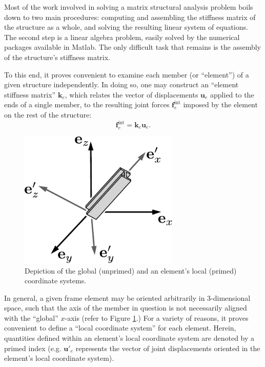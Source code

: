 \documentclass[12pt,a4paper,article]{memoir} %
\begin{document}
Most of the work involved in solving a matrix structural analysis problem boils down to two main procedures: computing and assembling the stiffness matrix of the structure as a whole, and solving the resulting linear system of equations. The second step is a linear algebra problem, easily solved by the numerical packages available in Matlab. The only difficult task that remains is the assembly of the structure's stiffness matrix.

To this end, it proves convenient to examine each member (or ``element'') of a given structure independently. In doing so, one may construct an ``element stiffness matrix'' $\mathbf{k}_e$, which relates the vector of displacements $\mathbf{u}_e$ applied to the ends of a single member, to the resulting joint forces $\mathbf{f}_e^{\text{int}}$ imposed by the element on the rest of the structure:
\begin{equation}
	\mathbf{f}_e^{\text{int}} = \mathbf{k}_e \mathbf{u}_e.
\end{equation}

\begin{figure}
	\centering
	\includegraphics[width = 3in]{figures/element_coordinate_system.pdf}
	\caption{Depiction of the global (unprimed) and an element's local (primed) coordinate systems.}
	\label{fig:element_coordinate_system}
\end{figure}
In general, a given frame element may be oriented arbitrarily in 3-dimensional space, such that the axis of the member in question is not necessarily aligned with the ``global'' $x$-axis (refer to Figure \ref{fig:element_coordinate_system}.) For a variety of reasons, it proves convenient to define a ``local coordinate system'' for each element. Herein, quantities defined within an element's local coordinate system are denoted by a primed index (e.g. $\mathbf{u}'_e$ represents the vector of joint displacements oriented in the element's local coordinate system).
\end{document}
